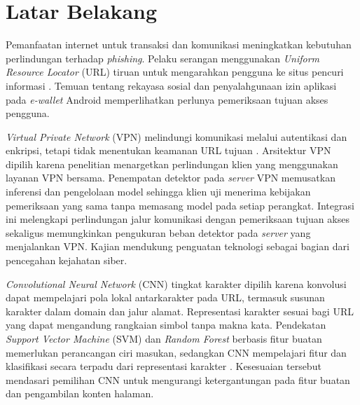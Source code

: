

\section{Latar Belakang}

Pemanfaatan internet untuk transaksi dan komunikasi meningkatkan kebutuhan perlindungan terhadap \textit{phishing}. Pelaku serangan menggunakan \textit{Uniform Resource Locator} (URL) tiruan untuk mengarahkan pengguna ke situs pencuri informasi \parencite{wei2020}. Temuan \textcite{putra2025} tentang rekayasa sosial dan penyalahgunaan izin aplikasi pada \textit{e-wallet} Android memperlihatkan perlunya pemeriksaan tujuan akses pengguna.

\textit{Virtual Private Network} (VPN) melindungi komunikasi melalui autentikasi dan enkripsi, tetapi tidak menentukan keamanan URL tujuan \parencite{sharma2020}. Arsitektur VPN dipilih karena penelitian menargetkan perlindungan klien yang menggunakan layanan VPN bersama. Penempatan detektor pada \textit{server} VPN memusatkan inferensi dan pengelolaan model sehingga klien uji menerima kebijakan pemeriksaan yang sama tanpa memasang model pada setiap perangkat. Integrasi ini melengkapi perlindungan jalur komunikasi dengan pemeriksaan tujuan akses sekaligus memungkinkan pengukuran beban detektor pada \textit{server} yang menjalankan VPN. Kajian \textcite{dzaky2025} mendukung penguatan teknologi sebagai bagian dari pencegahan kejahatan siber.

\textit{Convolutional Neural Network} (CNN) tingkat karakter dipilih karena konvolusi dapat mempelajari pola lokal antarkarakter pada URL, termasuk susunan karakter dalam domain dan jalur alamat. Representasi karakter sesuai bagi URL yang dapat mengandung rangkaian simbol tanpa makna kata. Pendekatan \textit{Support Vector Machine} (SVM) dan \textit{Random Forest} berbasis fitur buatan memerlukan perancangan ciri masukan, sedangkan CNN mempelajari fitur dan klasifikasi secara terpadu dari representasi karakter \parencite{aljofey2020}. Kesesuaian tersebut mendasari pemilihan CNN untuk mengurangi ketergantungan pada fitur buatan dan pengambilan konten halaman.

